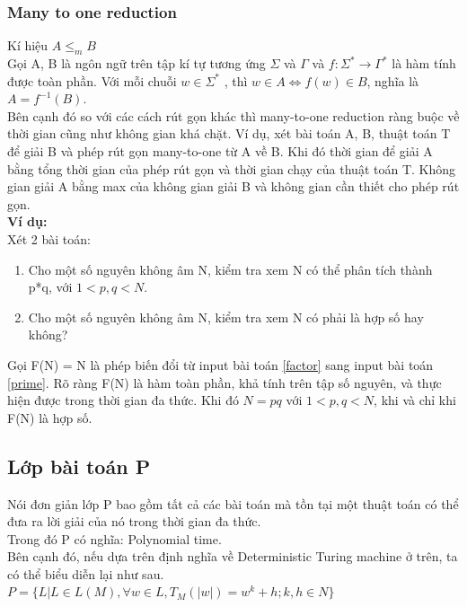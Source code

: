 \documentclass[a4paper 14pt]{article}
\begin{document}
			\subsubsection{Many to one reduction}
				Kí hiệu $A \leq_m B$\\
				Gọi A, B là ngôn ngữ trên tập kí tự tương ứng $\Sigma$ và $\Gamma$ và $f: \Sigma^* \to \Gamma^*$ là hàm tính được toàn phần. Với mỗi chuỗi $w \in \Sigma^*$ , thì $w \in A \Leftrightarrow f(w) \in B$, nghĩa là $A = f^{-1}(B)$.\\
				Bên cạnh đó so với các cách rút gọn khác thì many-to-one reduction ràng buộc về thời gian cũng như không gian khá chặt. Ví dụ, xét bài toán A, B, thuật toán T để giải B và phép rút gọn many-to-one từ A về B. Khi đó thời gian để giải A bằng tổng thời gian của phép rút gọn và thời gian chạy của thuật toán T. Không gian giải A bằng max của không gian giải B và không gian cần thiết cho phép rút gọn.\\
				\textbf{Ví dụ:}\\
				Xét 2 bài toán:
				\begin{enumerate}
					\item\label{factor} Cho một số nguyên không âm N, kiểm tra xem N có thể phân tích thành p*q, với $1 < p,q < N$.
					\item\label{prime} Cho một số nguyên không âm N, kiểm tra xem N có phải là hợp số hay không?
				\end{enumerate}
				Gọi F(N) = N là phép biến đổi từ input bài toán \ref{factor} sang input bài toán \ref{prime}. Rõ ràng F(N) là hàm toàn phần, khả tính trên tập số nguyên, và thực hiện được trong thời gian đa thức. Khi đó $N = pq$ với $1 < p,q < N$, khi và chỉ khi F(N) là hợp số.
		\subsection{Lớp bài toán P}
			Nói đơn giản lớp P bao gồm tất cả các bài toán mà tồn tại một thuật toán có thể đưa ra lời giải của nó trong thời gian đa thức.\\
			Trong đó P có nghĩa: Polynomial time.\\
			Bên cạnh đó, nếu dựa trên định nghĩa về Deterministic Turing machine ở trên, ta có thể biểu diễn lại như sau.
			$P = \{L| L \in L(M), \forall w \in L, T_M(|w|) = w^k + h; k,h \in N\}$\\		
			
\end{document}
